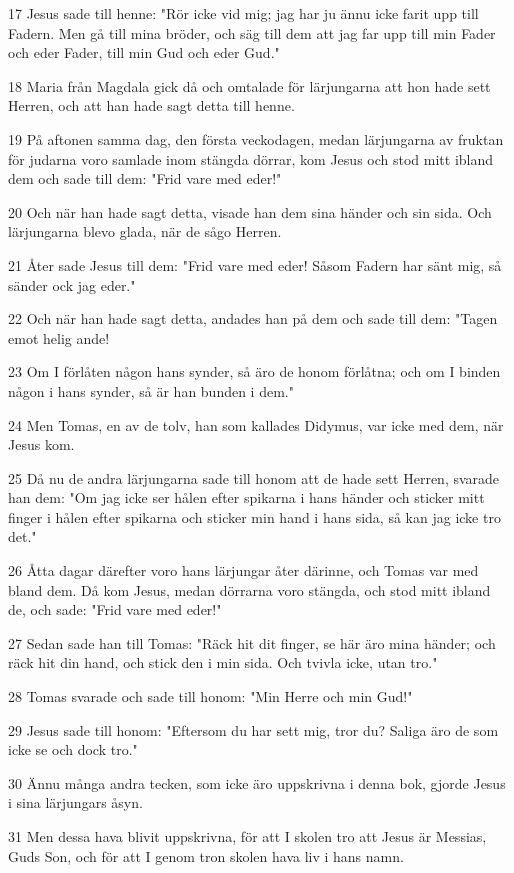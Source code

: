 \par 17 Jesus sade till henne: "Rör icke vid mig; jag har ju ännu icke farit upp till Fadern. Men gå till mina bröder, och säg till dem att jag far upp till min Fader och eder Fader, till min Gud och eder Gud."
\par 18 Maria från Magdala gick då och omtalade för lärjungarna att hon hade sett Herren, och att han hade sagt detta till henne.
\par 19 På aftonen samma dag, den första veckodagen, medan lärjungarna av fruktan för judarna voro samlade inom stängda dörrar, kom Jesus och stod mitt ibland dem och sade till dem: "Frid vare med eder!"
\par 20 Och när han hade sagt detta, visade han dem sina händer och sin sida. Och lärjungarna blevo glada, när de sågo Herren.
\par 21 Åter sade Jesus till dem: "Frid vare med eder! Såsom Fadern har sänt mig, så sänder ock jag eder."
\par 22 Och när han hade sagt detta, andades han på dem och sade till dem: "Tagen emot helig ande!
\par 23 Om I förlåten någon hans synder, så äro de honom förlåtna; och om I binden någon i hans synder, så är han bunden i dem."
\par 24 Men Tomas, en av de tolv, han som kallades Didymus, var icke med dem, när Jesus kom.
\par 25 Då nu de andra lärjungarna sade till honom att de hade sett Herren, svarade han dem: "Om jag icke ser hålen efter spikarna i hans händer och sticker mitt finger i hålen efter spikarna och sticker min hand i hans sida, så kan jag icke tro det."
\par 26 Åtta dagar därefter voro hans lärjungar åter därinne, och Tomas var med bland dem. Då kom Jesus, medan dörrarna voro stängda, och stod mitt ibland de, och sade: "Frid vare med eder!"
\par 27 Sedan sade han till Tomas: "Räck hit dit finger, se här äro mina händer; och räck hit din hand, och stick den i min sida. Och tvivla icke, utan tro."
\par 28 Tomas svarade och sade till honom: "Min Herre och min Gud!"
\par 29 Jesus sade till honom: "Eftersom du har sett mig, tror du? Saliga äro de som icke se och dock tro."
\par 30 Ännu många andra tecken, som icke äro uppskrivna i denna bok, gjorde Jesus i sina lärjungars åsyn.
\par 31 Men dessa hava blivit uppskrivna, för att I skolen tro att Jesus är Messias, Guds Son, och för att I genom tron skolen hava liv i hans namn.

